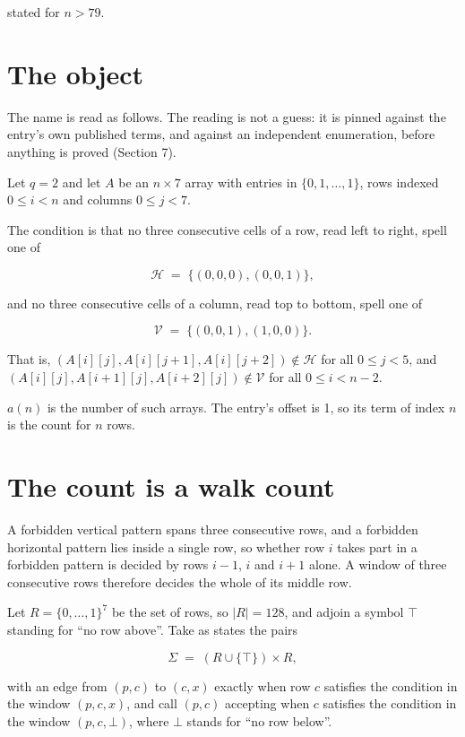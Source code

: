 \documentclass[11pt]{article}
\theoremstyle{definition}
\begin{document}
stated for $n > 79$.

\section{The object}

The name is read as follows. The reading is not a guess: it is pinned against the entry's own published terms, and against an independent enumeration, before anything is proved (Section 7).

Let $q = 2$ and let $A$ be an $n \times 7$ array with entries in $\{0,1,\dots,1\}$, rows indexed $0 \le i < n$ and columns $0 \le j < 7$.

The condition is that no three consecutive cells of a row, read left to right, spell one of

\[\mathcal{H} \;=\; \{(0,0,0), (0,0,1)\},\]

and no three consecutive cells of a column, read top to bottom, spell one of

\[\mathcal{V} \;=\; \{(0,0,1), (1,0,0)\}.\]

That is, $(A[i][j],A[i][j{+}1],A[i][j{+}2]) \notin \mathcal{H}$ for all $0 \le j < 5$, and $(A[i][j],A[i{+}1][j],A[i{+}2][j]) \notin \mathcal{V}$ for all $0 \le i < n-2$.

$a(n)$ is the number of such arrays. The entry's offset is 1, so its term of index $n$ is the count for $n$ rows.

\section{The count is a walk count}

A forbidden vertical pattern spans three consecutive rows, and a forbidden horizontal pattern lies inside a single row, so whether row $i$ takes part in a forbidden pattern is decided by rows $i-1$, $i$ and $i+1$ alone. A window of three consecutive rows therefore decides the whole of its middle row.

Let $R = \{0,\dots,1\}^{7}$ be the set of rows, so $|R| = 128$, and adjoin a symbol $\top$ standing for ``no row above''. Take as states the pairs

\[\Sigma \;=\; (R \cup \{\top\}) \times R,\]

with an edge from $(p,c)$ to $(c,x)$ exactly when row $c$ satisfies the condition in the window $(p,c,x)$, and call $(p,c)$ accepting when $c$ satisfies the condition in the window $(p,c,\bot)$, where $\bot$ stands for ``no row below''.
\end{document}
